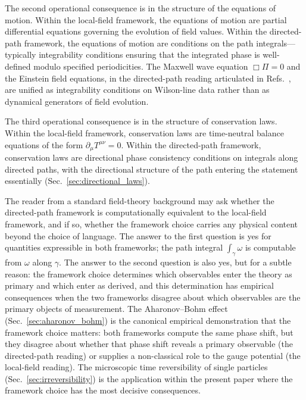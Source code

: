 \documentclass[%
 reprint, amsmath,amssymb, aps, prb, ]{revtex4-2}
\numberwithin{equation}{section}
\begin{document}
The second operational consequence is in the structure of the equations of motion. Within the local-field framework, the equations of motion are partial differential equations governing the evolution of field values. Within the directed-path framework, the equations of motion are conditions on the path integrals---typically integrability conditions ensuring that the integrated phase is well-defined modulo specified periodicities. The Maxwell wave equation $\Box \Pi = 0$ and the Einstein field equations, in the directed-path reading articulated in Refs.~\cite{hanamura30, hanamura55}, are unified as integrability conditions on Wilson-line data rather than as dynamical generators of field evolution.

The third operational consequence is in the structure of conservation laws. Within the local-field framework, conservation laws are time-neutral balance equations of the form $\partial_\mu T^{\mu\nu} = 0$. Within the directed-path framework, conservation laws are directional phase consistency conditions on integrals along directed paths, with the directional structure of the path entering the statement essentially (Sec.~\ref{sec:directional_laws}).

The reader from a standard field-theory background may ask whether the directed-path framework is computationally equivalent to the local-field framework, and if so, whether the framework choice carries any physical content beyond the choice of language. The answer to the first question is yes for quantities expressible in both frameworks; the path integral $\int_\gamma \omega$ is computable from $\omega$ along $\gamma$. The answer to the second question is also yes, but for a subtle reason: the framework choice determines which observables enter the theory as primary and which enter as derived, and this determination has empirical consequences when the two frameworks disagree about which observables are the primary objects of measurement. The Aharonov--Bohm effect (Sec.~\ref{sec:aharonov_bohm}) is the canonical empirical demonstration that the framework choice matters: both frameworks compute the same phase shift, but they disagree about whether that phase shift reveals a primary observable (the directed-path reading) or supplies a non-classical role to the gauge potential (the local-field reading). The microscopic time reversibility of single particles (Sec.~\ref{sec:irreversibility}) is the application within the present paper where the framework choice has the most decisive consequences.
\end{document}
